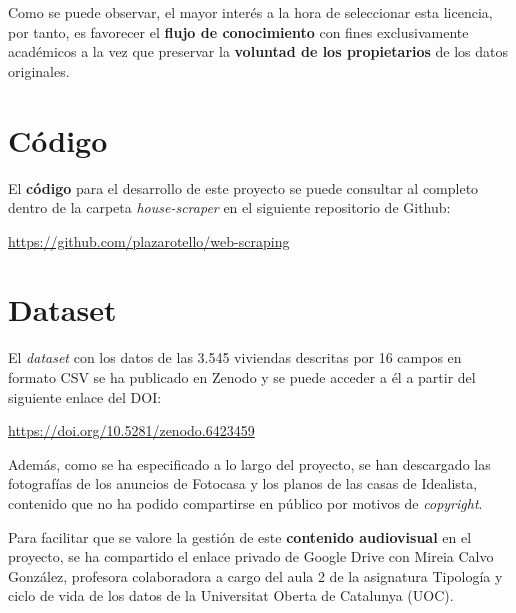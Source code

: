 \documentclass[12pt]{article}
\begin{document}
Como se puede observar, el mayor interés a la hora de seleccionar esta licencia, por tanto, es favorecer el \textbf{flujo de conocimiento} con fines exclusivamente académicos a la vez que preservar la \textbf{voluntad de los propietarios} de los datos originales. 

\vspace{-1.5em}\section{Código}\vspace{-1em}

El \textbf{código} para el desarrollo de este proyecto se puede consultar al completo dentro de la carpeta \textit{house-scraper} en el siguiente repositorio de Github: 

\vspace{-1em}\begin{center}\url{https://github.com/plazarotello/web-scraping}\end{center}\vspace{-1em}


\vspace{-1.5em}\section{Dataset}\vspace{-1em}

El \textit{dataset} con los datos de las 3.545 viviendas descritas por 16 campos en formato CSV se ha publicado en Zenodo y se puede acceder a él a partir del siguiente enlace del DOI: 

\vspace{-1em}\begin{center}\url{https://doi.org/10.5281/zenodo.6423459}\end{center}\vspace{-1em}

Además, como se ha especificado a lo largo del proyecto, se han descargado las fotografías de los anuncios de Fotocasa y los planos de las casas de Idealista, contenido que no ha podido compartirse en público por motivos de \textit{copyright}.

Para facilitar que se valore la gestión de este \textbf{contenido audiovisual} en el proyecto, se ha compartido el enlace privado de Google Drive con Mireia Calvo González, profesora colaboradora a cargo del aula 2 de la asignatura Tipología y ciclo de vida de los datos de la Universitat Oberta de Catalunya (UOC). 
\end{document}
